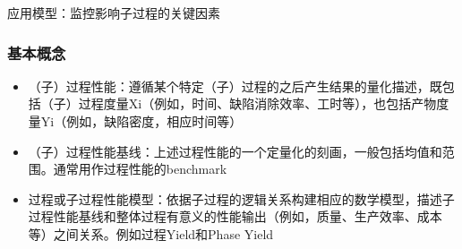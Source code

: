 应用模型：监控影响子过程的关键因素

\subsubsection{基本概念}
\begin{itemize}
    \item （子）过程性能：遵循某个特定（子）过程的之后产生结果的量化描述，既包括（子）过程度量Xi（例如，时间、缺陷消除效率、工时等），也包括产物度量Yi（例如，缺陷密度，相应时间等）
    \item （子）过程性能基线：上述过程性能的一个定量化的刻画，一般包括均值和范围。通常用作过程性能的benchmark
    \item 过程或子过程性能模型：依据子过程的逻辑关系构建相应的数学模型，描述子过程性能基线和整体过程有意义的性能输出（例如，质量、生产效率、成本等）之间关系。例如过程Yield和Phase Yield
\end{itemize}

